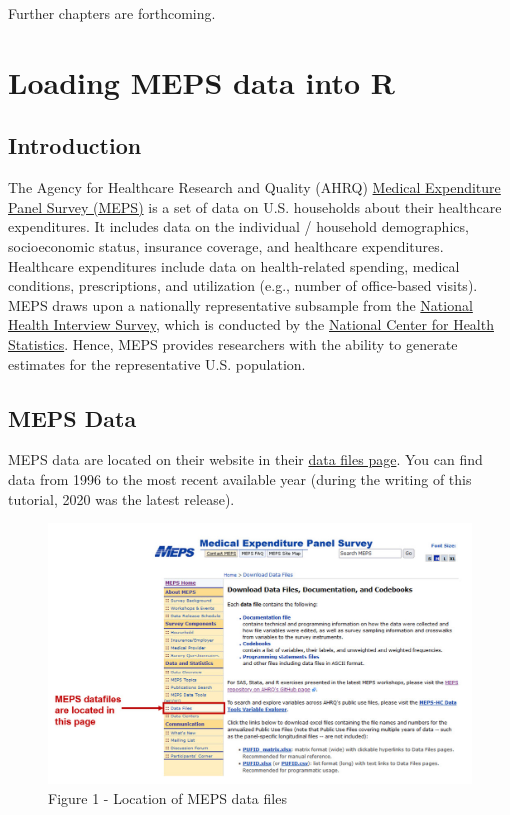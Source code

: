 \documentclass[
]{book}
\begin{document}
Further chapters are forthcoming.

\hypertarget{intro}{%
\chapter{Loading MEPS data into R}\label{intro}}

\hypertarget{introduction}{%
\section{Introduction}\label{introduction}}

The Agency for Healthcare Research and Quality (AHRQ) \href{https://www.meps.ahrq.gov/mepsweb/}{Medical Expenditure Panel Survey (MEPS)} is a set of data on U.S. households about their healthcare expenditures. It includes data on the individual / household demographics, socioeconomic status, insurance coverage, and healthcare expenditures. Healthcare expenditures include data on health-related spending, medical conditions, prescriptions, and utilization (e.g., number of office-based visits). MEPS draws upon a nationally representative subsample from the \href{https://www.cdc.gov/nchs/nhis/index.htm?CDC_AA_refVal=https\%3A\%2F\%2Fwww.cdc.gov\%2Fnchs\%2Fnhis.htm}{National Health Interview Survey}, which is conducted by the \href{https://www.cdc.gov/nchs/index.htm}{National Center for Health Statistics}. Hence, MEPS provides researchers with the ability to generate estimates for the representative U.S. population.

\hypertarget{meps-data}{%
\section{MEPS Data}\label{meps-data}}

MEPS data are located on their website in their \href{https://www.meps.ahrq.gov/mepsweb/data_stats/download_data_files.jsp}{data files page}. You can find data from 1996 to the most recent available year (during the writing of this tutorial, 2020 was the latest release).

\begin{figure}
\includegraphics[width=1\linewidth]{Figure 1} \caption{Figure 1 - Location of MEPS data files}\label{fig:unnamed-chunk-2}
\end{figure}
\end{document}
